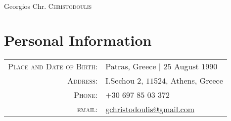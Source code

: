 \documentclass[a4paper,10pt]{article}
\begin{document}
\pagestyle{plain} %



\par{\centering
		{\Huge Georgios Chr. \textsc{Christodoulis}
	}\bigskip\par}


\section{Personal Information}

\begin{tabular}{rl}
    \textsc{Place and Date of Birth:} & Patras, Greece  | $25$ August $1990$ \\
    \textsc{Address:}   & I.Sechou $2$, $11524$, Athens, Greece \\
    \textsc{Phone:}     & $+30$ $697$ $85$ $03$ $372$\\
    \textsc{email:}     & \href{mailto:gchristodoulis@gmail.com}{gchristodoulis@gmail.com}
\end{tabular}

\end{document}

